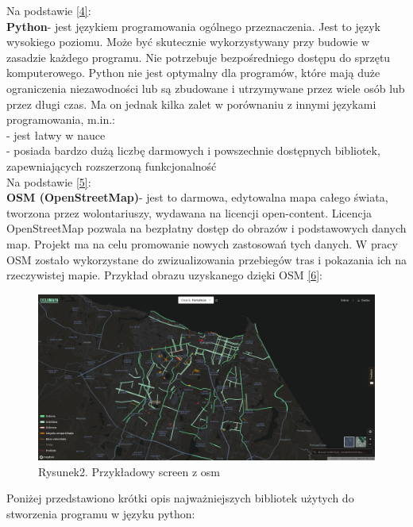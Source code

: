 \documentclass[a4paper, twoside, 12pt, justified]{article}
\begin{document}
	 Na podstawie \hyperlink{python}{[4]}:\\
	 \textbf{Python}- jest językiem programowania ogólnego przeznaczenia. Jest to język wysokiego poziomu. Może być skutecznie wykorzystywany przy budowie w zasadzie każdego programu. Nie potrzebuje bezpośredniego dostępu do sprzętu komputerowego. Python nie jest optymalny dla programów, które mają duże ograniczenia niezawodności lub są zbudowane i utrzymywane przez wiele osób lub przez długi czas. Ma on jednak kilka zalet w porównaniu z innymi językami programowania, m.in.:\\
	 - jest łatwy w nauce\\ 
	 - posiada bardzo dużą liczbę darmowych i powszechnie dostępnych bibliotek, zapewniających rozszerzoną funkcjonalność\\ 
	 
	 Na podstawie \hyperlink{osm}{[5]}:\\
	 \textbf{OSM (OpenStreetMap)}- jest to darmowa, edytowalna mapa całego świata, tworzona przez wolontariuszy, wydawana na licencji open-content. Licencja OpenStreetMap pozwala na bezpłatny dostęp do obrazów i podstawowych danych map. Projekt ma na celu promowanie nowych zastosowań tych danych. W pracy OSM zostało wykorzystane do zwizualizowania przebiegów tras i pokazania ich na rzeczywistej mapie. Przykład obrazu uzyskanego dzięki OSM \hyperlink{osm_photo}{[6]}: \\
	 
 	\begin{figure}[h]
 	\includegraphics[scale=0.23]{osm_example}
 	\centering
 	\\
 	{Rysunek2. Przykładowy screen z osm}
	\end{figure}
	 
	 Poniżej przedstawiono krótki opis najważniejszych bibliotek użytych do stworzenia programu w języku python: \\
	 
\end{document}
